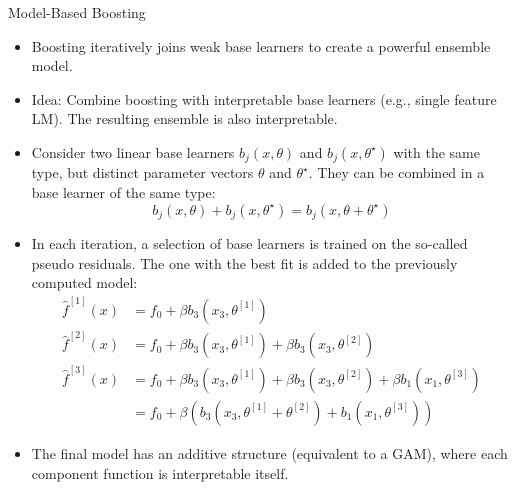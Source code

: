 \documentclass[11pt,compress,t,notes=noshow, aspectratio=169, xcolor=table]{beamer}
\begin{document}
\begin{frame}{Model-Based Boosting}

\begin{itemize}
\item
Boosting iteratively joins weak base learners to create a powerful ensemble model.
\item
Idea: Combine boosting with interpretable base learners (e.g., single feature LM). The resulting ensemble is also interpretable.
\item
Consider two linear base learners $b_j(x, \theta)$ and $b_j(x, \theta^{\star})$ with the same type, but distinct parameter vectors $\theta$ and $\theta^{\star}$. They can be combined in a base learner of the same type:
$$
b_j(x, \theta) + b_j(x, \theta^{\star}) = b_j(x, \theta + \theta^{\star})
$$
\item In each iteration, a selection of base learners is trained on the so-called pseudo residuals. The one with the best fit is added to the previously computed model:
\medskip
\begin{align*}
\widehat{f}^{[1]}(x) &= f_0 + \beta b_3(x_3, \theta^{[1]}) \\
\widehat{f}^{[2]}(x) &= f_0 + \beta b_3(x_3, \theta^{[1]}) + \beta b_3(x_3, \theta^{[2]})\\
\widehat{f}^{[3]}(x) &= f_0 + \beta b_3(x_3, \theta^{[1]}) + \beta b_3(x_3, \theta^{[2]}) + \beta b_1(x_1, \theta^{[3]}) \\
&= f_0 + \beta \left(b_3(x_3, \theta^{[1]} + \theta^{[2]}) + b_1(x_1, \theta^{[3]})\right)
\end{align*}

\item The final model has an additive structure (equivalent to a GAM), where each component function is interpretable itself.

\end{itemize}
\end{frame}





\end{document}
